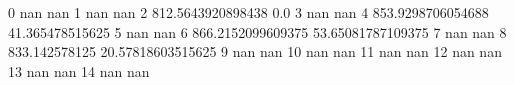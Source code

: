 0 nan nan
1 nan nan
2 812.5643920898438 0.0
3 nan nan
4 853.9298706054688 41.365478515625
5 nan nan
6 866.2152099609375 53.65081787109375
7 nan nan
8 833.142578125 20.57818603515625
9 nan nan
10 nan nan
11 nan nan
12 nan nan
13 nan nan
14 nan nan

